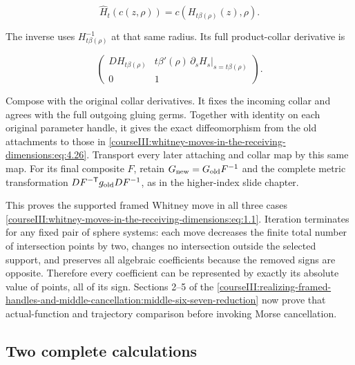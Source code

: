\begin{equation}
\widehat H_t(c(z,\rho))=c(H_{t\beta(\rho)}(z),\rho).
 \label{courseIII:whitney-moves-in-the-receiving-dimensions:eq:4.27}
\end{equation}

The inverse uses \(H_{t\beta(\rho)}^{-1}\) at that same radius. Its full product-collar derivative is

\begin{equation}
\begin{pmatrix}
 DH_{t\beta(\rho)}
   &t\beta'(\rho)\,\left.\partial_sH_s\right|_{s=t\beta(\rho)}\\
 0&1
 \end{pmatrix}.
 \label{courseIII:whitney-moves-in-the-receiving-dimensions:eq:4.28}
\end{equation}

Compose with the original collar derivatives. It fixes the incoming collar and agrees with the full outgoing gluing germs. Together with identity on each original parameter handle, it gives the exact diffeomorphism from the old attachments to those in \eqref{courseIII:whitney-moves-in-the-receiving-dimensions:eq:4.26}. Transport every later attaching and collar map by this same map. For its final composite \(F\), retain \(G_{\rm new}=G_{\rm old}F^{-1}\) and the complete metric transformation \(DF^{-{\mathsf T}}g_{\rm old}DF^{-1}\), as in the higher-index slide chapter.

This proves the supported framed Whitney move in all three cases \eqref{courseIII:whitney-moves-in-the-receiving-dimensions:eq:1.1}. Iteration terminates for any fixed pair of sphere systems: each move decreases the finite total number of intersection points by two, changes no intersection outside the selected support, and preserves all algebraic coefficients because the removed signs are opposite. Therefore every coefficient can be represented by exactly its absolute value of points, all of its sign. Sections 2--5 of the \cref{courseIII:realizing-framed-handles-and-middle-cancellation:middle-six-seven-reduction} now prove that actual-function and trajectory comparison before invoking Morse cancellation.

\subsection{Two complete calculations}
\label{courseIII:whitney-moves-in-the-receiving-dimensions:receiving-whitney-exercises}

\label{courseIII:whitney-moves-in-the-receiving-dimensions:section-5}

